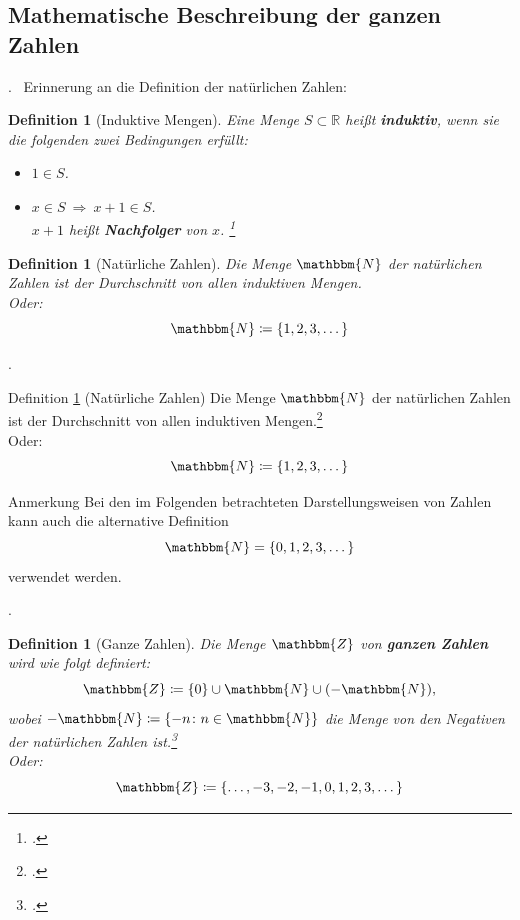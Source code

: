 \documentclass{beamer}
\newcommand{\N}{\mathbbm{N}} %
\newcommand{\Z}{\mathbbm{Z}} %
\newcommand{\R}{\mathbb{R}} %
\newtheorem{defn}[satz]{Definition}
\newcommand{\subsecframe}{\begin{frame}{\insertsectionnumber.\insertsubsectionnumber \ \insertsubsection}}
\begin{document}
    \subsection{Mathematische Beschreibung der ganzen Zahlen}      
        \subsecframe
            Erinnerung an die Definition der natürlichen Zahlen:
            \begin{defn}[Induktive Mengen]
                Eine Menge $S \subset \R$ heißt \textbf{induktiv}, wenn sie die folgenden zwei Bedingungen erfüllt:
                \begin{itemize}
                    \item $1 \in S$.
                    \item $x \in S ~\Rightarrow~ x+1 \in S$. \\
                        $x+1$ heißt \textbf{Nachfolger} von $x$. \footcite{grigor2024}
                \end{itemize}
            \end{defn}
            \begin{defn}[Natürliche Zahlen] \label{def:nat-zahlen}
                Die Menge $\N$ der natürlichen Zahlen ist der Durchschnitt von allen induktiven Mengen.  \\
                Oder: \[\N \coloneq \{1,2,3, \dots\}\]
            \end{defn}
        \end{frame}

        \subsecframe
            \begin{block}{Definition \ref{def:nat-zahlen} (Natürliche Zahlen)}
                Die Menge $\N$ der natürlichen Zahlen ist der Durchschnitt von allen induktiven Mengen.\footcite{grigor2024}  \\
                Oder: \[\N \coloneq \{1,2,3, \dots\}\]                
            \end{block}
            \begin{block}{Anmerkung}
                Bei den im Folgenden betrachteten Darstellungsweisen von Zahlen kann auch die alternative Definition
                \[\N = \{0,1,2,3,\dots\}\]
                verwendet werden.
            \end{block}
        \end{frame}

        \subsecframe
            \begin{defn} [Ganze Zahlen]
                Die Menge $\Z$ von \textbf{ganzen Zahlen} wird wie folgt definiert:
                \[\Z \coloneq \{0\} \cup \N \cup (-\N), \]
                wobei $-\N \coloneq \{-n \colon n \in \N\}$ die Menge von den Negativen der natürlichen Zahlen ist.\footcite{grigor2024} \\
                Oder: \[\Z \coloneq \{\dots, -3,-2,-1,0,1,2,3,\dots\}\]
            \end{defn}
        \end{frame}
\end{document}
